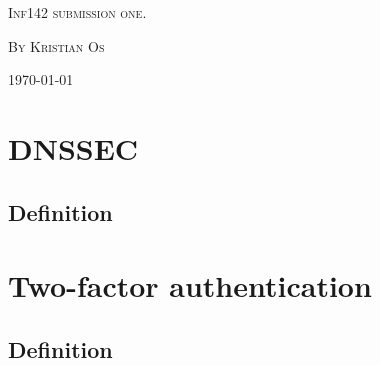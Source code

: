 \documentclass{article}
\begin{document}
	\begin{titlepage}
		\centering
		{\scshape\Large Inf142 submission one.\par}
		\vspace{3em}
		{{\scshape\large By Kristian Os \par}}
		\vfill
		\large\today
		
		
	\end{titlepage}
	\tableofcontents
	\section{DNSSEC}
	
		\subsection{Definition}
		
		
	
	
	
	\section{Two-factor authentication}
		\subsection{Definition}
	
	
\end{document}
